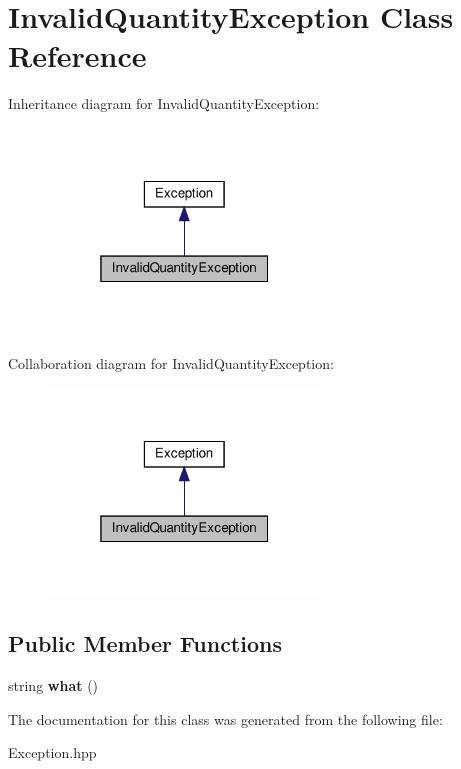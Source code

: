 \hypertarget{classInvalidQuantityException}{}\section{Invalid\+Quantity\+Exception Class Reference}
\label{classInvalidQuantityException}


Inheritance diagram for Invalid\+Quantity\+Exception\+:
\nopagebreak
\begin{figure}[H]
\begin{center}
\leavevmode
\includegraphics[width=205pt]{classInvalidQuantityException__inherit__graph}
\end{center}
\end{figure}


Collaboration diagram for Invalid\+Quantity\+Exception\+:
\nopagebreak
\begin{figure}[H]
\begin{center}
\leavevmode
\includegraphics[width=205pt]{classInvalidQuantityException__coll__graph}
\end{center}
\end{figure}
\subsection*{Public Member Functions}
\begin{DoxyCompactItemize}
\item 
\mbox{\label{classInvalidQuantityException_a1e880d8b67ea560423b24aa2113bda55}} 
string {\bfseries what} ()
\end{DoxyCompactItemize}


The documentation for this class was generated from the following file\+:\begin{DoxyCompactItemize}
\item 
Exception.\+hpp\end{DoxyCompactItemize}

